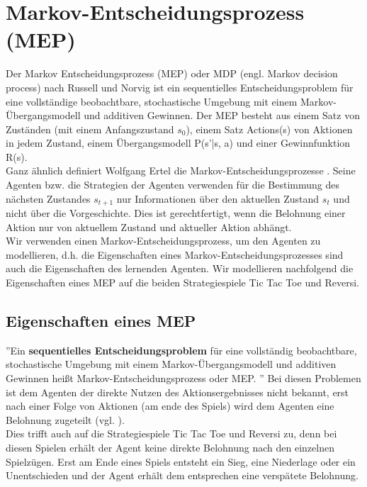 \section{Markov-Entscheidungsprozess (MEP)}
\label{sec:Markov-Entscheidungsprozess}
Der Markov Entscheidungsprozess (MEP) oder MDP (engl. Markov decision process) nach Russell und Norvig \cite[752 \psqq]{Russell} ist ein sequentielles Entscheidungsproblem für eine vollständige beobachtbare, stochastische Umgebung mit einem Markov-Übergangsmodell und additiven Gewinnen. Der MEP besteht aus einem Satz von Zuständen (mit einem Anfangszustand $s_0$), einem Satz Actions(s) von Aktionen in jedem Zustand, einem Übergangsmodell P(s'|s, a) und einer Gewinnfunktion R(s). \\

Ganz ähnlich definiert Wolfgang Ertel die Markov-Entscheidungsprozesse \cite[291]{Ertel}. Seine Agenten bzw. die Strategien der Agenten verwenden für die Bestimmung des nächsten Zustandes $s_{t+1}$ nur Informationen über den aktuellen Zustand $s_t$ und nicht über die Vorgeschichte. Dies ist gerechtfertigt, wenn die Belohnung einer Aktion nur von aktuellem Zustand und aktueller Aktion abhängt.\\

Wir verwenden einen Markov-Entscheidungsprozess, um den Agenten zu modellieren, d.h. die Eigenschaften eines Markov-Entscheidungsprozesses sind auch die Eigenschaften des lernenden Agenten. Wir modellieren nachfolgend die Eigenschaften eines MEP auf die beiden Strategiespiele Tic Tac Toe und Reversi. \\

\subsection{Eigenschaften eines MEP}
''Ein \textbf{sequentielles Entscheidungsproblem} für eine vollständig beobachtbare, stochastische Umgebung mit einem Markov-Übergangsmodell und additiven Gewinnen heißt Markov-Entscheidungsprozess oder MEP. \cite[752]{Russell}'' Bei diesen Problemen ist dem Agenten der direkte Nutzen des Aktionsergebnisses nicht bekannt, erst nach einer Folge von Aktionen (am ende des Spiels) wird dem Agenten eine Belohnung zugeteilt (vgl. \cite[397]{Alpaydin}). \\

Dies trifft auch auf die Strategiespiele Tic Tac Toe und Reversi zu, denn bei diesen Spielen erhält der Agent keine direkte Belohnung nach den einzelnen Spielzügen. Erst am Ende eines Spiels entsteht ein Sieg, eine Niederlage oder ein Unentschieden und der Agent erhält dem entsprechen eine verspätete Belohnung. \\  

